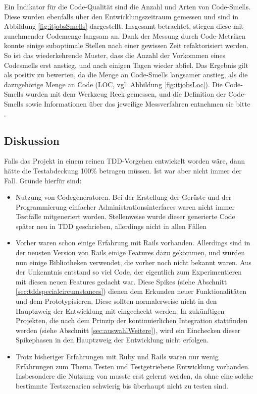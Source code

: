 Ein Indikator für die Code-Qualität sind die Anzahl und Arten von Code-Smells. Diese wurden ebenfalls über den Entwicklungszeitraum gemessen und sind in Abbildung \ref{fig:itjobsSmells} dargestellt. Insgesamt betrachtet, stiegen diese mit zunehmender Codemenge langsam an. Dank der Messung durch Code-Metriken konnte einige suboptimale Stellen nach einer gewissen Zeit refaktorisiert werden. So ist das wiederkehrende Muster, dass die Anzahl der Vorkommen eines Codesmells erst anstieg, und nach einigen Tagen wieder abfiel. Das Ergebnis gilt als positiv zu bewerten, da die Menge an Code-Smells langsamer anstieg, als die dazugehörige Menge an Code (LOC, vgl. Abbildung \ref{fig:itjobsLoc}). Die Code-Smells wurden mit dem Werkzeug Reek gemessen, und die Definition der Code-Smells sowie Informationen über das jeweilige Messverfahren entnehmen sie bitte \citep{kevin_rutherford_code_2010}.

\subsection*{Diskussion}
Falls das Projekt in einem reinen TDD-Vorgehen entwickelt worden wäre, dann hätte die Testabdeckung 100\% betragen müssen. Ist war aber nicht immer der Fall. Gründe hierfür sind:
\begin{itemize}
 \item Nutzung von Codegeneratoren. Bei der Erstellung der Gerüste und der Programmierung einfacher Administrationsinterfaces waren nicht immer Testfälle mitgeneriert worden. Stellenweise wurde dieser generierte Code später neu in TDD geschrieben, allerdings nicht in allen Fällen
 \item Vorher waren schon einige Erfahrung mit Rails vorhanden. Allerdings sind in der neusten Version von Rails einige Features dazu gekommen, und wurden nun einige Bibliotheken verwendet, die vorher noch nicht bekannt waren. Aus der Unkenntnis entstand so viel Code, der eigentlich zum Experimentieren mit diesen neuen Features gedacht war. Diese Spikes (siehe Abschnitt \ref{sec:tddspecialcircumstances}) dienen dem Erkunden neuer Funktionalitäten und dem Prototypisieren. Diese sollten normalerweise nicht in den Hauptzweig der Entwicklung mit eingecheckt werden. In zukünftigen Projekten, die nach dem Prinzip der kontinuierlichen Integration stattfinden werden (siehe Abschnitt \ref{sec:auswahlWeitere}), wird ein Einchecken dieser Spikephasen in den Hauptzweig der Entwicklung nicht erfolgen.
 \item Trotz bisheriger Erfahrungen mit Ruby und Rails waren nur wenig Erfahrungen zum Thema Testen und Testgetriebene Entwicklung vorhanden. Insbesondere die Nutzung von  musste erst gelernt werden, da ohne eine solche bestimmte Testszenarien schwierig bis überhaupt nicht zu testen sind.
\end{itemize}

